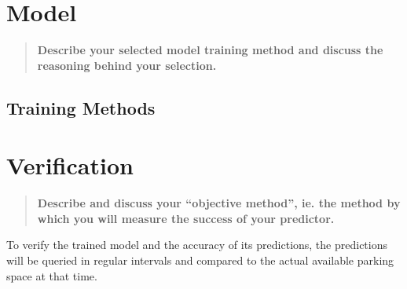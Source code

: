 \documentclass[journal,10pt]{IEEEtran}
\newcommand{\subtask}[1]{\begin{quote}\textbf{#1}\end{quote}}
\begin{document}
\section{Model}
\subtask{Describe your selected model training method and discuss the reasoning behind your selection.}
\subsection{Training Methods} 

\section{Verification}
\subtask{Describe and discuss your ``objective method'', ie. the method by which you will measure the success of your predictor.}
To verify the trained model and the accuracy of its predictions, the predictions will be queried in regular intervals and compared to the actual available parking space at that time. 


  

\end{document}
